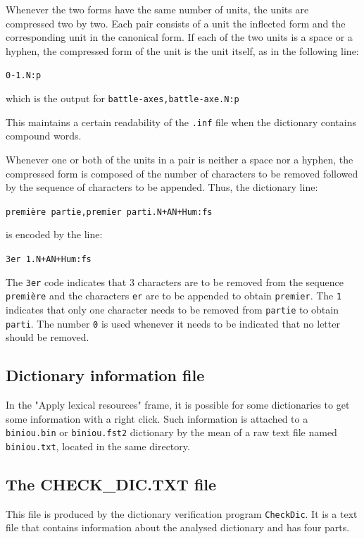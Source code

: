 \bigskip
\noindent Whenever the two forms have the same number of units, the units are compressed
two by two. Each pair consists of a unit the inflected form and the corresponding
unit in the canonical form. If each of the two units is a space or a hyphen, the
compressed form of the unit is the unit itself, as in the following line:


\bigskip
\verb$0-1.N:p$

\bigskip
\noindent which is the output for \verb$battle-axes,battle-axe.N:p$

\bigskip
\noindent This maintains a certain readability of the \verb+.inf+ file when the dictionary
contains compound words.

\bigskip
\noindent Whenever one or both of the units in a pair is neither a space nor a
hyphen, the compressed form is composed of the number of characters to be removed
followed by the sequence of characters to be appended. Thus, the dictionary line:

\bigskip
\noindent
\texttt{premi\`ere partie,premier parti.N+AN+Hum:fs}

\bigskip
\noindent is encoded by the line:

\bigskip
\verb$3er 1.N+AN+Hum:fs$

\bigskip
\noindent The \verb+3er+ code indicates that 3 characters are to be removed from
the sequence \texttt{premi\`ere} and the characters \verb+er+ are to be appended
to obtain \verb+premier+. The \verb+1+ indicates that only one character needs to be
removed from \verb+partie+ to obtain \verb+parti+. The number \verb+0+ is used
whenever it needs to be indicated that no letter should be removed.


\subsection{Dictionary information file}
In the "Apply lexical resources" frame, it is possible for some dictionaries to
get some information with a right click. Such information is attached to a
\verb+biniou.bin+ or \verb+biniou.fst2+ dictionary by the mean of a raw text
file named \verb+biniou.txt+, located in the same directory.

\subsection{The CHECK\_DIC.TXT file}
This file is produced by the dictionary verification program \verb+CheckDic+. It
is a text file that contains information about the analysed dictionary and has
four parts.

